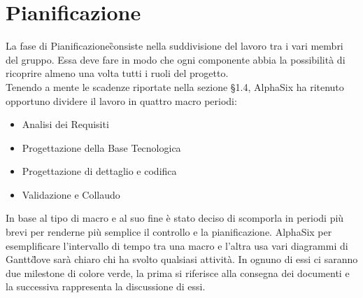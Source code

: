 \newpage
\section{Pianificazione}\label{Pianificazione}
    La fase di Pianificazione\G consiste nella suddivisione del lavoro tra i vari membri del gruppo. Essa deve fare in modo che ogni componente abbia la possibilità di ricoprire almeno una volta tutti i ruoli del progetto.\\
    Tenendo a mente le scadenze riportate nella sezione §1.4,
     AlphaSix ha ritenuto opportuno dividere il lavoro in quattro
     macro periodi:
     \begin{itemize}
		\item Analisi dei Requisiti
		\item Progettazione della Base Tecnologica
		\item Progettazione di dettaglio e codifica
		\item Validazione e Collaudo
     \end{itemize}
    
    In base al tipo di macro e al suo fine è stato deciso di scomporla in periodi più brevi per renderne più semplice il
    controllo e la pianificazione. AlphaSix per esemplificare l'intervallo di tempo tra una macro e l'altra usa vari
    diagrammi di Gantt\G dove sarà chiaro chi ha svolto qualsiasi attività. In ognuno di essi ci saranno due
    milestone di colore verde, la prima si riferisce alla consegna dei documenti e la successiva rappresenta la discussione di essi.

